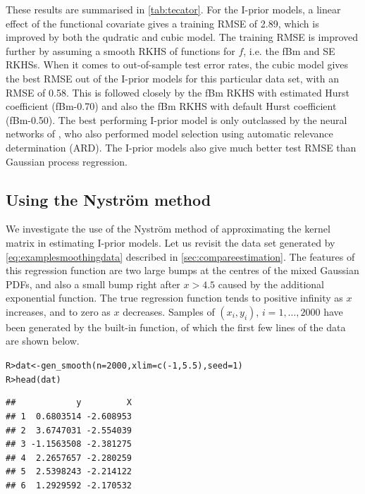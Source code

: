 \documentclass[showframe,11pt]{report}\usepackage[]{graphicx}\usepackage[]{color}
\makeatletter
\newcommand{\hlnum}[1]{\textcolor[rgb]{0.063,0.58,0.627}{#1}}%
\newcommand{\hlopt}[1]{\textcolor[rgb]{0.196,0.196,0.196}{#1}}%
\newcommand{\hlstd}[1]{\textcolor[rgb]{0.196,0.196,0.196}{#1}}%
\newcommand{\hlkwb}[1]{\textcolor[rgb]{0.627,0,0.314}{#1}}%
\newcommand{\hlkwc}[1]{\textcolor[rgb]{0,0.631,0.314}{#1}}%
\newcommand{\hlkwd}[1]{\textcolor[rgb]{0.78,0.227,0.412}{#1}}%
\newenvironment{kframe}{%
 \def\at@end@of@kframe{}%
 \ifinner\ifhmode%
  \def\at@end@of@kframe{\end{minipage}}%
  \begin{minipage}{\columnwidth}%
 \fi\fi%
 \def\FrameCommand##1{\hskip\@totalleftmargin \hskip-\fboxsep
 \colorbox{shadecolor}{##1}\hskip-\fboxsep
     \hskip-\linewidth \hskip-\@totalleftmargin \hskip\columnwidth}%
 \MakeFramed {\advance\hsize-\width
   \@totalleftmargin\z@ \linewidth\hsize
   \@setminipage}}%
 {\par\unskip\endMakeFramed%
 \at@end@of@kframe}
\newenvironment{knitrout}{}{} %
\makeatother
\begin{document}
These results are summarised in \cref{tab:tecator}.
For the I-prior models, a linear effect of the functional covariate gives a training RMSE of 2.89, which is improved by both the qudratic and cubic model.
The training RMSE is improved further by assuming a smooth RKHS of functions for $f$, i.e. the fBm and SE RKHSs.
When it comes to out-of-sample test error rates, the cubic model gives the best RMSE out of the I-prior models for this particular data set, with an RMSE of 0.58.
This is followed closely by the fBm RKHS with estimated Hurst coefficient (fBm-0.70) and also the fBm RKHS with default Hurst coefficient (fBm-0.50).
The best performing I-prior model is only outclassed by the neural networks of \citet{thodberg1996review}, who also performed model selection using automatic relevance determination (ARD).
The I-prior models also give much better test RMSE than Gaussian process regression.

\subsection[Using the Nystrom method]{Using the Nystr\"om method}

We investigate the use of the Nystr\"om method of approximating the kernel matrix in estimating I-prior models.
Let us revisit the data set generated by \cref{eq:examplesmoothingdata} described in \cref{sec:compareestimation}.
The features of this regression function are two large bumps at the centres of the mixed Gaussian PDFs, and also a small bump right after $x>4.5$ caused by the additional exponential function.
The true regression function tends to positive infinity as $x$ increases, and to zero as $x$ decreases.
Samples of $(x_i,y_i)$, $i=1,\dots,2000$ have been generated by the built-in  function, of which the first few lines of the data are shown below.

\begin{knitrout}
\color{fgcolor}\begin{kframe}
\begin{alltt}
\hlstd{R> }\hlstd{dat} \hlkwb{<-} \hlkwd{gen_smooth}\hlstd{(}\hlkwc{n} \hlstd{=} \hlnum{2000}\hlstd{,} \hlkwc{xlim} \hlstd{=} \hlkwd{c}\hlstd{(}\hlopt{-}\hlnum{1}\hlstd{,} \hlnum{5.5}\hlstd{),} \hlkwc{seed} \hlstd{=} \hlnum{1}\hlstd{)}
\hlstd{R> }\hlkwd{head}\hlstd{(dat)}
\end{alltt}
\begin{verbatim}
##            y         X
## 1  0.6803514 -2.608953
## 2  3.6747031 -2.554039
## 3 -1.1563508 -2.381275
## 4  2.2657657 -2.280259
## 5  2.5398243 -2.214122
## 6  1.2929592 -2.170532
\end{verbatim}
\end{kframe}
\end{knitrout}
\end{document}
